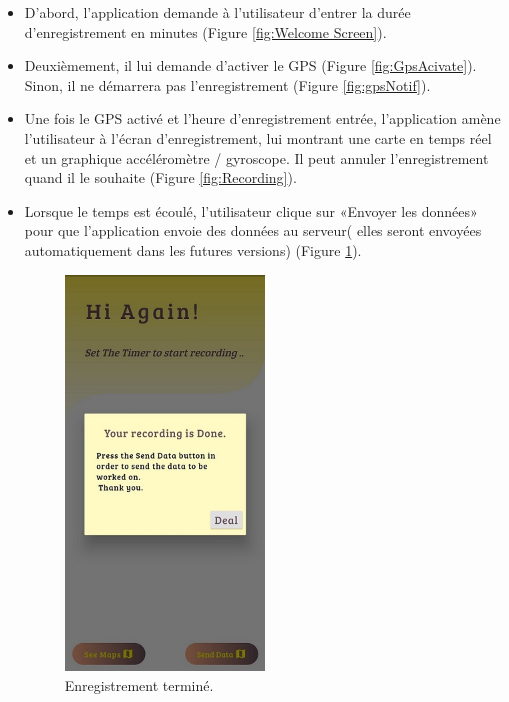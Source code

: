 \begin{itemize}
    \item D'abord, l'application demande à l'utilisateur d'entrer la durée d'enregistrement en minutes (Figure \ref{fig:Welcome Screen}).
          
    \item Deuxièmement, il lui demande d'activer le GPS (Figure \ref{fig:GpsAcivate}). Sinon, il ne démarrera pas l'enregistrement (Figure \ref{fig:gpsNotif}).
     



    \item Une fois le GPS activé et l'heure d'enregistrement entrée, l'application amène l'utilisateur à l'écran d'enregistrement, lui montrant une carte en temps réel et un graphique accéléromètre / gyroscope. Il peut annuler l'enregistrement quand il le souhaite (Figure \ref{fig:Recording}).
    
 

   

    \item Lorsque le temps est écoulé, l’utilisateur clique sur «Envoyer les données» pour que l’application envoie des données au serveur( elles seront envoyées automatiquement dans les futures versions) (Figure \ref{fig:Done}).
          \begin{figure}[h!]
              \center
              \includegraphics[width=0.50\textwidth]{Images/recordingApp/doneRecording.jpg}
              \caption{Enregistrement terminé.}
              \label{fig:Done}
          \end{figure}


\end{itemize}
